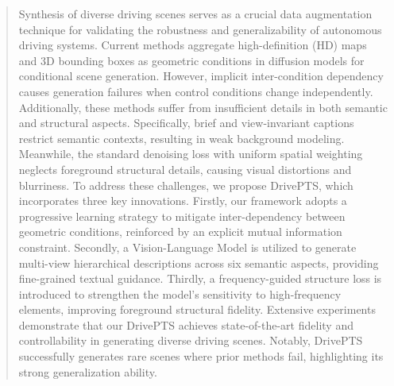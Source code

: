 \begin{abstract}
Synthesis of diverse driving scenes serves as a crucial data augmentation technique for validating the robustness and generalizability of autonomous driving systems. 
Current methods aggregate high-definition (HD) maps and 3D bounding boxes as geometric conditions in diffusion models for conditional scene generation.
However, implicit inter-condition dependency causes generation failures when control conditions change independently.
Additionally, these methods suffer from insufficient details in both semantic and structural aspects. 
Specifically, brief and view-invariant captions restrict semantic contexts, resulting in weak background modeling. 
Meanwhile, the standard denoising loss with uniform spatial weighting neglects foreground structural details, causing visual distortions and blurriness.
To address these challenges, we propose DrivePTS, which incorporates three key innovations.
Firstly, our framework adopts a progressive learning strategy to mitigate inter-dependency between geometric conditions, reinforced by an explicit mutual information constraint. 
Secondly, a Vision-Language Model is utilized to generate multi-view hierarchical descriptions across six semantic aspects, providing fine-grained textual guidance. 
Thirdly, a frequency-guided structure loss is introduced to strengthen the model's sensitivity to high-frequency elements, improving foreground structural fidelity.
Extensive experiments demonstrate that our DrivePTS achieves state-of-the-art fidelity and controllability in generating diverse driving scenes.
Notably, DrivePTS successfully generates rare scenes where prior methods fail, highlighting its strong generalization ability.
\end{abstract}